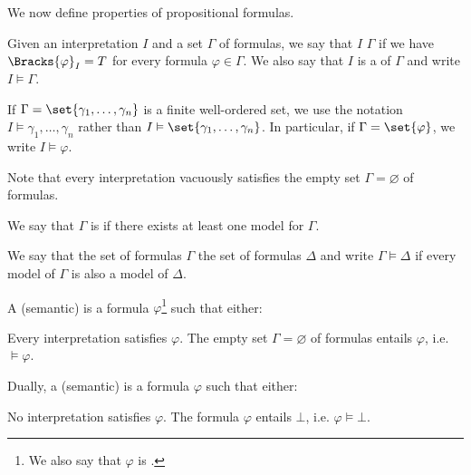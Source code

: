 \begin{definition}\label{def:propositional_semantics}\mimprovised
  We now define  properties of propositional formulas.

  \begin{thmenum}
     Given an interpretation \( I \) and a set \( \Gamma \) of formulas, we say that \( I \)  \( \Gamma \) if we have \( \Bracks{\varphi}_I = T \) for every formula \( \varphi \in \Gamma \). We also say that \( I \) is a  of \( \Gamma \) and write \( I \vDash \Gamma \).

    If \( \Gamma = \set{ \gamma_1, \ldots, \gamma_n } \) is a finite well-ordered set, we use the notation \( I \vDash \gamma_1, \ldots, \gamma_n \) rather than \( I \vDash \set{ \gamma_1, \ldots, \gamma_n } \). In particular, if \( \Gamma = \set{ \varphi } \), we write \( I \vDash \varphi \).

    Note that every interpretation vacuously satisfies the empty set \( \Gamma = \varnothing \) of formulas.

     We say that \( \Gamma \) is  if there exists at least one model for \( \Gamma \).

     We say that the set of formulas \( \Gamma \)  the set of formulas \( \Delta \) and write \( \Gamma \vDash \Delta \) if every model of \( \Gamma \) is also a model of \( \Delta \).

     A (semantic)  is a formula \( \varphi \)\footnote{We also say that \( \varphi \) is .} such that either:
    \begin{thmenum}
       Every interpretation satisfies \( \varphi \).
       The empty set \( \Gamma = \varnothing \) of formulas entails \( \varphi \), i.e. \( \vDash \varphi \).
    \end{thmenum}

     Dually, a (semantic)  is a formula \( \varphi \) such that either:
    \begin{thmenum}
       No interpretation satisfies \( \varphi \).
       The formula \( \varphi \) entails \( \bot \), i.e. \( \varphi \vDash \bot \).
    \end{thmenum}


\end{thmenum}
\end{definition}
